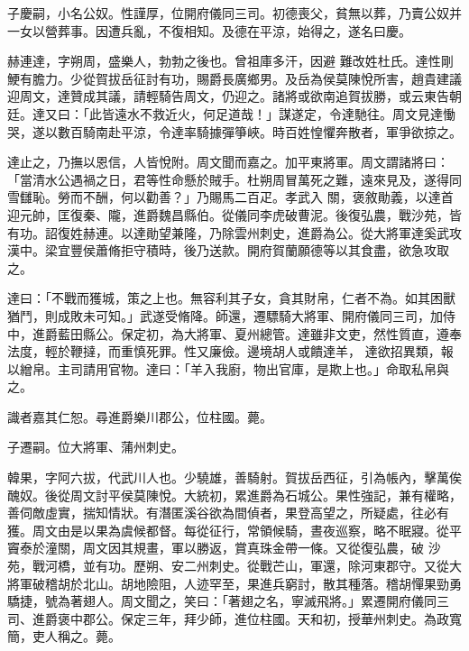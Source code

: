 \begin{pinyinscope}
 子慶嗣，小名公奴。性謹厚，位開府儀同三司。初德喪父，貧無以葬，乃賣公奴并一女以營葬事。因遭兵亂，不復相知。及德在平涼，始得之，遂名曰慶。



 赫連達，字朔周，盛樂人，勃勃之後也。曾祖庫多汗，因避
 難改姓杜氏。達性剛鯁有膽力。少從賀拔岳征討有功，賜爵長廣鄉男。及岳為侯莫陳悅所害，趙貴建議迎周文，達贊成其議，請輕騎告周文，仍迎之。諸將或欲南追賀拔勝，或云東告朝廷。達又曰：「此皆遠水不救近火，何足道哉！」謀遂定，令達馳往。周文見達慟哭，遂以數百騎南赴平涼，令達率騎據彈箏峽。時百姓惶懼奔散者，軍爭欲掠之。



 達止之，乃撫以恩信，人皆悅附。周文聞而嘉之。加平東將軍。周文謂諸將曰：「當清水公遇禍之日，君等性命懸於賊手。杜朔周冒萬死之難，遠來見及，遂得同雪讎恥。勞而不酬，何以勸善？」乃賜馬二百疋。孝武入
 關，褒敘勛義，以達首迎元帥，匡復秦、隴，進爵魏昌縣伯。從儀同李虎破曹泥。後復弘農，戰沙苑，皆有功。詔復姓赫連。以達勛望兼隆，乃除雲州刺史，進爵為公。從大將軍達奚武攻漢中。梁宜豐侯蕭脩拒守積時，後乃送款。開府賀蘭願德等以其食盡，欲急攻取之。



 達曰：「不戰而獲城，策之上也。無容利其子女，貪其財帛，仁者不為。如其困獸猶鬥，則成敗未可知。」武遂受脩降。師還，遷驃騎大將軍、開府儀同三司，加侍中，進爵藍田縣公。保定初，為大將軍、夏州總管。達雖非文吏，然性質直，遵奉法度，輕於鞭撻，而重慎死罪。性又廉儉。邊境胡人或饋達羊，
 達欲招異類，報以繒帛。主司請用官物。達曰：「羊入我廚，物出官庫，是欺上也。」命取私帛與之。



 識者嘉其仁恕。尋進爵樂川郡公，位柱國。薨。



 子遷嗣。位大將軍、蒲州刺史。



 韓果，字阿六拔，代武川人也。少驍雄，善騎射。賀拔岳西征，引為帳內，擊萬俟醜奴。後從周文討平侯莫陳悅。大統初，累進爵為石城公。果性強記，兼有權略，善伺敵虛實，揣知情狀。有潛匿溪谷欲為間偵者，果登高望之，所疑處，往必有獲。周文由是以果為虞候都督。每從征行，常領候騎，晝夜巡察，略不眠寢。從平竇泰於潼關，周文因其規畫，軍以勝返，賞真珠金帶一條。又從復弘農，破
 沙苑，戰河橋，並有功。歷朔、安二州刺史。從戰芒山，軍還，除河東郡守。又從大將軍破稽胡於北山。胡地險阻，人迹罕至，果進兵窮討，散其種落。稽胡憚果勁勇驕捷，號為著翅人。周文聞之，笑曰：「著翅之名，寧滅飛將。」累遷開府儀同三司、進爵褒中郡公。保定三年，拜少師，進位柱國。天和初，授華州刺史。為政寬簡，吏人稱之。薨。




\end{pinyinscope}
